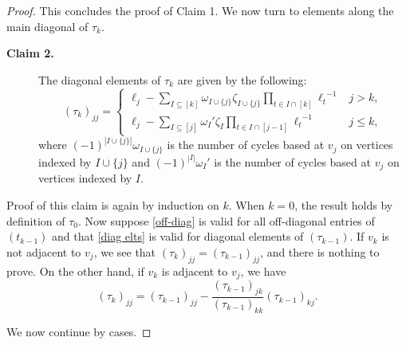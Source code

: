 \documentclass[10pt,a4paper]{amsart}
\begin{document}
\begin{proof}
This concludes the proof of Claim 1.  We now turn to elements along the main diagonal of $\tau_k$.

\begin{description}
\item [{\bf Claim 2.}] The diagonal elements of $\tau_k$ are given by the following:
\begin{equation}\label{diag elts}
(\tau_k)_{jj}=\begin{cases}\ell_j-\sum_{I\subseteq [k]}\omega_{I\cup\{j\}}\zeta_{I\cup\{j\}}\prod_{t\in I\cap[k]}{\ell_t}^{-1}&j>k,\\
\ell_j-\sum_{I\subseteq [j]}{\omega_I}'\zeta_I\prod_{t\in I\cap[j-1]}{\ell_t}^{-1}&j\le k,
\end{cases}
\end{equation} where $(-1)^{|I\cup\{j\}|}\omega_{I\cup\{j\}}$ is the number of cycles based at $v_j$ on vertices indexed by $I\cup\{j\}$ and $(-1)^{|I|}{\omega_I}'$ is the number of cycles based at $v_j$ on vertices indexed by $I$.  
\end{description}

Proof of this claim is again by induction on $k$.  When $k=0$, the result holds by definition of $\tau_0$.  Now suppose \eqref{off-diag} is valid for all off-diagonal entries of $(t_{k-1})$ and that \eqref{diag elts} is valid for diagonal elements of $(\tau_{k-1})$.   If $v_k$ is not adjacent to $v_j$, we see that $(\tau_k)_{jj}=(\tau_{k-1})_{jj}$, and there is nothing to prove.  On the other hand, if $v_k$ is adjacent to $v_j$, we have 
\begin{equation}\label{diagonal recurrence}
(\tau_k)_{jj}=(\tau_{k-1})_{jj}-\frac{(\tau_{k-1})_{jk}}{(\tau_{k-1})_{kk}}(\tau_{k-1})_{kj}.
\end{equation}  

We now continue by cases.


\end{proof}
\end{document}
